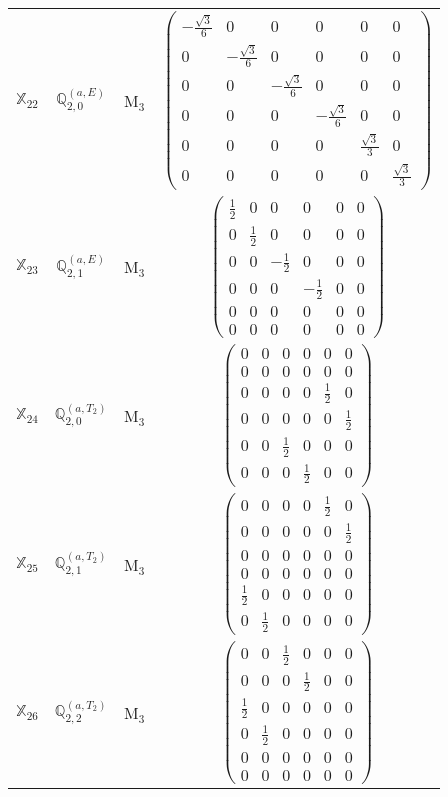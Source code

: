 \documentclass[fleqn,10pt,landscape]{article}
\begin{document}
\begin{itemize}
\begin{center}
\begin{longtable}{c|c|c|c}
$ \mathbb{X}_{22} $ & $\mathbb{Q}_{2,0}^{(a,E)}$ & M$_{3}$ & $\begin{pmatrix} - \frac{\sqrt{3}}{6} & 0 & 0 & 0 & 0 & 0 \\ 0 & - \frac{\sqrt{3}}{6} & 0 & 0 & 0 & 0 \\ 0 & 0 & - \frac{\sqrt{3}}{6} & 0 & 0 & 0 \\ 0 & 0 & 0 & - \frac{\sqrt{3}}{6} & 0 & 0 \\ 0 & 0 & 0 & 0 & \frac{\sqrt{3}}{3} & 0 \\ 0 & 0 & 0 & 0 & 0 & \frac{\sqrt{3}}{3} \end{pmatrix}$ \\
$ \mathbb{X}_{23} $ & $\mathbb{Q}_{2,1}^{(a,E)}$ & M$_{3}$ & $\begin{pmatrix} \frac{1}{2} & 0 & 0 & 0 & 0 & 0 \\ 0 & \frac{1}{2} & 0 & 0 & 0 & 0 \\ 0 & 0 & - \frac{1}{2} & 0 & 0 & 0 \\ 0 & 0 & 0 & - \frac{1}{2} & 0 & 0 \\ 0 & 0 & 0 & 0 & 0 & 0 \\ 0 & 0 & 0 & 0 & 0 & 0 \end{pmatrix}$ \\
$ \mathbb{X}_{24} $ & $\mathbb{Q}_{2,0}^{(a,T_{2})}$ & M$_{3}$ & $\begin{pmatrix} 0 & 0 & 0 & 0 & 0 & 0 \\ 0 & 0 & 0 & 0 & 0 & 0 \\ 0 & 0 & 0 & 0 & \frac{1}{2} & 0 \\ 0 & 0 & 0 & 0 & 0 & \frac{1}{2} \\ 0 & 0 & \frac{1}{2} & 0 & 0 & 0 \\ 0 & 0 & 0 & \frac{1}{2} & 0 & 0 \end{pmatrix}$ \\
$ \mathbb{X}_{25} $ & $\mathbb{Q}_{2,1}^{(a,T_{2})}$ & M$_{3}$ & $\begin{pmatrix} 0 & 0 & 0 & 0 & \frac{1}{2} & 0 \\ 0 & 0 & 0 & 0 & 0 & \frac{1}{2} \\ 0 & 0 & 0 & 0 & 0 & 0 \\ 0 & 0 & 0 & 0 & 0 & 0 \\ \frac{1}{2} & 0 & 0 & 0 & 0 & 0 \\ 0 & \frac{1}{2} & 0 & 0 & 0 & 0 \end{pmatrix}$ \\
$ \mathbb{X}_{26} $ & $\mathbb{Q}_{2,2}^{(a,T_{2})}$ & M$_{3}$ & $\begin{pmatrix} 0 & 0 & \frac{1}{2} & 0 & 0 & 0 \\ 0 & 0 & 0 & \frac{1}{2} & 0 & 0 \\ \frac{1}{2} & 0 & 0 & 0 & 0 & 0 \\ 0 & \frac{1}{2} & 0 & 0 & 0 & 0 \\ 0 & 0 & 0 & 0 & 0 & 0 \\ 0 & 0 & 0 & 0 & 0 & 0 \end{pmatrix}$ \\

\end{longtable}
\end{center}
\end{itemize}
\end{document}
